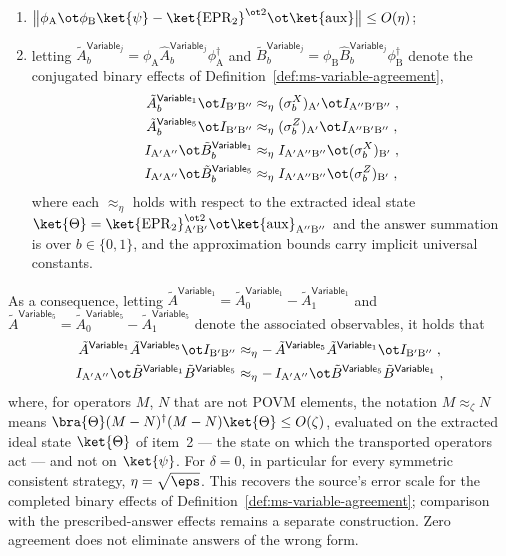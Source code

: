 \begin{theorem}
	\begin{enumerate}
		\item $\bigl\| \phi_{\mathrm A} \ot \phi_{\mathrm B} \ket{\psi} - \ket{\mathrm{EPR}_2}^{\ot 2} \ot \ket{\mathrm{aux}} \bigr\| \le O(\eta)$;
		\item letting $\tilde A^{\mathsf{Variable}_j}_b = \phi_{\mathrm A} \hat A^{\mathsf{Variable}_j}_b \phi_{\mathrm A}^\dagger$ and $\tilde B^{\mathsf{Variable}_j}_b = \phi_{\mathrm B} \hat B^{\mathsf{Variable}_j}_b \phi_{\mathrm B}^\dagger$ denote the conjugated binary effects of Definition~\ref{def:ms-variable-agreement},
		\begin{align*}
			\tilde A^{\mathsf{Variable}_1}_b \ot I_{\mathrm{B'B''}} &\approx_{\eta} (\sigma^X_b)_{\mathrm A'} \ot I_{\mathrm{A''B'B''}}\;,\\
			\tilde A^{\mathsf{Variable}_5}_b \ot I_{\mathrm{B'B''}} &\approx_{\eta} (\sigma^Z_b)_{\mathrm A'} \ot I_{\mathrm{A''B'B''}}\;,\\
			I_{\mathrm{A'A''}} \ot \tilde B^{\mathsf{Variable}_1}_b &\approx_{\eta} I_{\mathrm{A'A''B''}} \ot (\sigma^X_b)_{\mathrm B'}\;,\\
			I_{\mathrm{A'A''}} \ot \tilde B^{\mathsf{Variable}_5}_b &\approx_{\eta} I_{\mathrm{A'A''B''}} \ot (\sigma^Z_b)_{\mathrm B'}\;,
		\end{align*}
		where each $\approx_{\eta}$ holds with respect to the extracted ideal state $\ket{\Theta} = \ket{\mathrm{EPR}_2}^{\ot 2}_{\mathrm{A'B'}} \ot \ket{\mathrm{aux}}_{\mathrm{A''B''}}$ and the answer summation is over $b \in \{0,1\}$, and the approximation bounds carry implicit universal constants.
	\end{enumerate}
	As a consequence, letting $\tilde A^{\mathsf{Variable}_1} = \tilde A^{\mathsf{Variable}_1}_0 - \tilde A^{\mathsf{Variable}_1}_1$ and $\tilde A^{\mathsf{Variable}_5} = \tilde A^{\mathsf{Variable}_5}_0 - \tilde A^{\mathsf{Variable}_5}_1$ denote the associated observables, it holds that
	\begin{align*}
		\tilde A^{\mathsf{Variable}_1} \tilde A^{\mathsf{Variable}_5} \ot I_{\mathrm{B'B''}} &\approx_{\eta} -\, \tilde A^{\mathsf{Variable}_5} \tilde A^{\mathsf{Variable}_1} \ot I_{\mathrm{B'B''}}\;,\\
		I_{\mathrm{A'A''}} \ot \tilde B^{\mathsf{Variable}_1} \tilde B^{\mathsf{Variable}_5} &\approx_{\eta} -\, I_{\mathrm{A'A''}} \ot \tilde B^{\mathsf{Variable}_5} \tilde B^{\mathsf{Variable}_1}\;,
	\end{align*}
	where, for operators $M$, $N$ that are not POVM elements, the notation $M \approx_\zeta N$ means $\bra{\Theta} (M-N)^\dagger (M-N) \ket{\Theta} \le O(\zeta)$, evaluated on the extracted ideal state $\ket{\Theta}$ of item~2 --- the state on which the transported operators act --- and not on $\ket{\psi}$. For $\delta = 0$, in particular for every symmetric consistent strategy, $\eta = \sqrt\eps$.
	This recovers the source's error scale for the completed binary effects of
	Definition~\ref{def:ms-variable-agreement}; comparison with the
	prescribed-answer effects remains a separate construction. Zero agreement
	does not eliminate answers of the wrong form.
\end{theorem}
